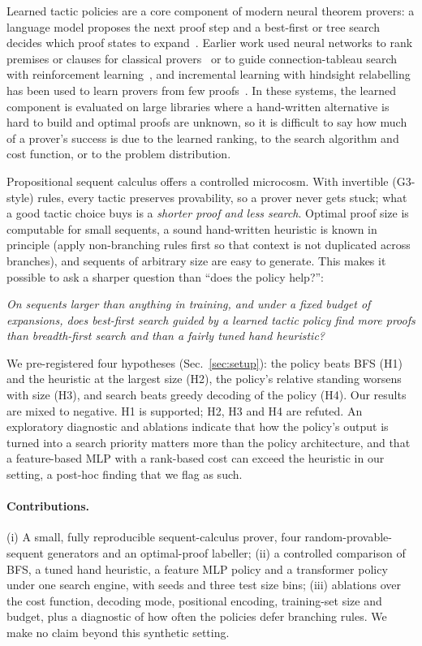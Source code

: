 Learned tactic policies are a core component of modern neural theorem provers: a language model proposes the next proof step and a best-first or tree search decides which proof states to expand~\cite{polu2020generative,lample2022hypertree,xin2025bfs,yang2023leandojo}. Earlier work used neural networks to rank premises or clauses for classical provers~\cite{alemi2016deepmath,loos2017deep} or to guide connection-tableau search with reinforcement learning~\cite{kaliszyk2018reinforcement}, and incremental learning with hindsight relabelling has been used to learn provers from few proofs~\cite{aygn2021proving}. In these systems, the learned component is evaluated on large libraries where a hand-written alternative is hard to build and optimal proofs are unknown, so it is difficult to say how much of a prover's success is due to the learned ranking, to the search algorithm and cost function, or to the problem distribution.

Propositional sequent calculus offers a controlled microcosm. With invertible (G3-style) rules, every tactic preserves provability, so a prover never gets stuck; what a good tactic choice buys is a \emph{shorter proof and less search}. Optimal proof size is computable for small sequents, a sound hand-written heuristic is known in principle (apply non-branching rules first so that context is not duplicated across branches), and sequents of arbitrary size are easy to generate. This makes it possible to ask a sharper question than ``does the policy help?'':

\emph{On sequents larger than anything in training, and under a fixed budget of  expansions, does best-first search guided by a learned tactic policy find more proofs than breadth-first search and than a fairly tuned hand heuristic?}

We pre-registered four hypotheses (Sec.~\ref{sec:setup}): the policy beats BFS (H1) and the heuristic at the largest size (H2), the policy's relative standing worsens with size (H3), and search beats greedy decoding of the policy (H4). Our results are mixed to negative. H1 is supported; H2, H3 and H4 are refuted. An exploratory diagnostic and ablations indicate that how the policy's output is turned into a search priority matters more than the policy architecture, and that a feature-based MLP with a rank-based cost can exceed the heuristic in our setting, a post-hoc finding that we flag as such.

\paragraph{Contributions.} (i) A small, fully reproducible sequent-calculus prover, four random-provable-sequent generators and an optimal-proof labeller; (ii) a controlled comparison of BFS, a tuned hand heuristic, a feature MLP policy and a transformer policy under one search engine, with  seeds and three test size bins; (iii) ablations over the cost function, decoding mode, positional encoding, training-set size and budget, plus a diagnostic of how often the policies defer branching rules. We make no claim beyond this synthetic setting.
